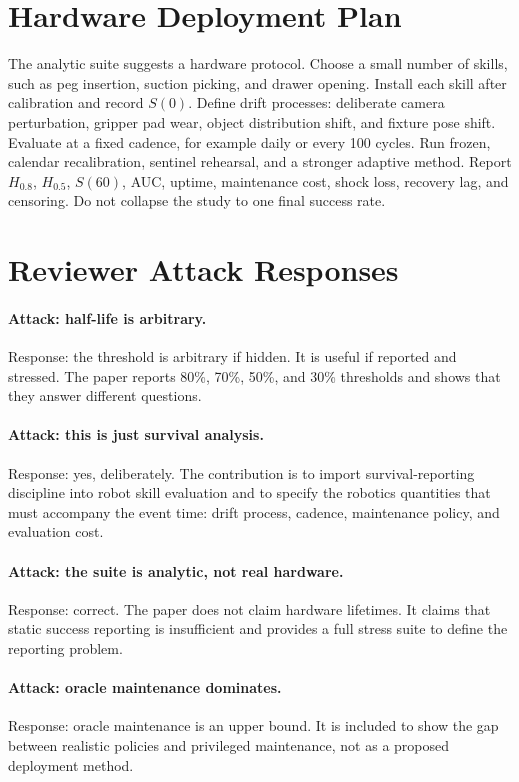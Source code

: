 \documentclass{article}
\newcommand{\half}{H_{0.5}}
\newcommand{\life}[1]{H_{#1}}
\begin{document}
\section{Hardware Deployment Plan}

The analytic suite suggests a hardware protocol. Choose a small number of
skills, such as peg insertion, suction picking, and drawer opening. Install each
skill after calibration and record $S(0)$. Define drift processes: deliberate
camera perturbation, gripper pad wear, object distribution shift, and fixture
pose shift. Evaluate at a fixed cadence, for example daily or every 100 cycles.
Run frozen, calendar recalibration, sentinel rehearsal, and a stronger adaptive
method. Report $\life{0.8}$, $\half$, $S(60)$, AUC, uptime, maintenance cost,
shock loss, recovery lag, and censoring. Do not collapse the study to one final
success rate.

\section{Reviewer Attack Responses}

\paragraph{Attack: half-life is arbitrary.}
Response: the threshold is arbitrary if hidden. It is useful if reported and
stressed. The paper reports 80\%, 70\%, 50\%, and 30\% thresholds and shows
that they answer different questions.

\paragraph{Attack: this is just survival analysis.}
Response: yes, deliberately. The contribution is to import survival-reporting
discipline into robot skill evaluation and to specify the robotics quantities
that must accompany the event time: drift process, cadence, maintenance policy,
and evaluation cost.

\paragraph{Attack: the suite is analytic, not real hardware.}
Response: correct. The paper does not claim hardware lifetimes. It claims that
static success reporting is insufficient and provides a full stress suite to
define the reporting problem.

\paragraph{Attack: oracle maintenance dominates.}
Response: oracle maintenance is an upper bound. It is included to show the gap
between realistic policies and privileged maintenance, not as a proposed
deployment method.
\end{document}
